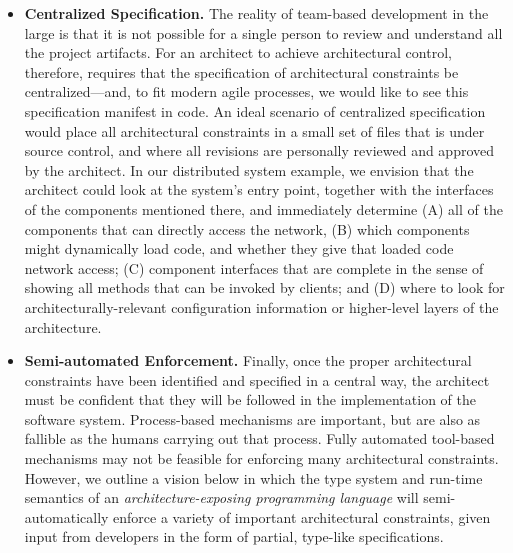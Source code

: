 \documentclass[runningheads]{llncs}
\begin{document}
\begin{sloppypar}
\begin{itemize}
\item \textbf{Centralized Specification.}  The reality of team-based development in the large is that it is not possible for a single person to review and understand all the project artifacts.  For an architect to achieve architectural control, therefore, requires that the specification of architectural constraints be centralized---and, to fit modern agile processes, we would like to see this specification manifest in code.  An ideal scenario of centralized specification would place all architectural constraints in a small set of files that is under source control, and where all revisions are personally reviewed and approved by the architect.  In our distributed system example, we envision that the architect could look at the system's entry point, together with the interfaces of the components mentioned there, and immediately determine (A) all of the components that can directly access the network, (B) which components might dynamically load code, and whether they give that loaded code network access; (C) component interfaces that are complete in the sense of showing all methods that can be invoked by clients; and (D) where to look for architecturally-relevant configuration information or higher-level layers of the architecture.


\item \textbf{Semi-automated Enforcement.}  Finally, once the proper architectural constraints have been identified and specified in a central way, the architect must be confident that they will be followed in the implementation of the software system.  Process-based mechanisms are important, but are also as fallible as the humans carrying out that process.  Fully automated tool-based mechanisms may not be feasible for enforcing many architectural constraints.  However, we outline a vision below in which the type system and run-time semantics of an \emph{architecture-exposing programming language} will semi-automatically enforce a variety of important architectural constraints, given input from developers in the form of partial, type-like specifications.


\end{itemize}
\end{sloppypar}
\end{document}
